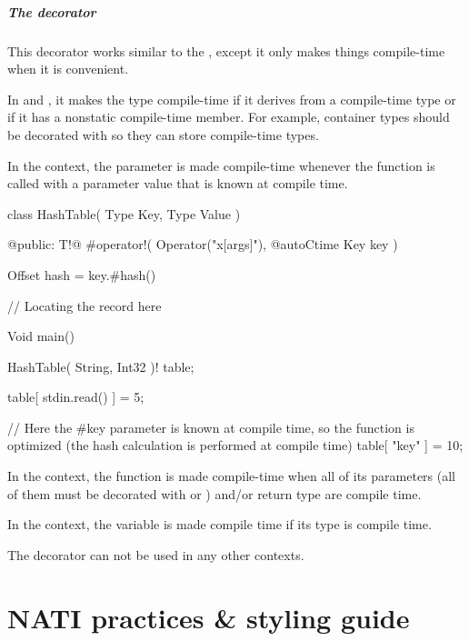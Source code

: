 \paragraph{The  decorator} \label{decorator:autoCtime} This decorator works similar to the , except it only makes things compile-time when it is convenient.

In  and , it makes the type compile-time if it derives from a compile-time type or if it has a nonstatic compile-time member. For example, container types should be decorated with  so they can store compile-time types.

In the  context, the parameter is made compile-time whenever the function is called with a parameter value that is known at compile time.
\begin{code}
class HashTable( Type Key, Type Value ) {

@public:
	T!@ #operator!( Operator("x[args]"), @autoCtime Key key ) {
		Offset hash = key.#hash() %
		
		// Locating the record here 
	}
	
}

Void main() {
	HashTable( String, Int32 )! table;
	
	table[ stdin.read() ] = 5;
	
	// Here the #key parameter is known at compile time, so the function is optimized (the hash calculation is performed at compile time)
	table[ "key" ] = 10;
}
\end{code}

In the  context, the function is made compile-time when all of its parameters (all of them must be decorated with  or ) and/or return type are compile time.

In the  context, the variable is made compile time if its type is compile time.

The decorator can not be used in any other contexts.

\chapter{NATI practices \& styling guide}

